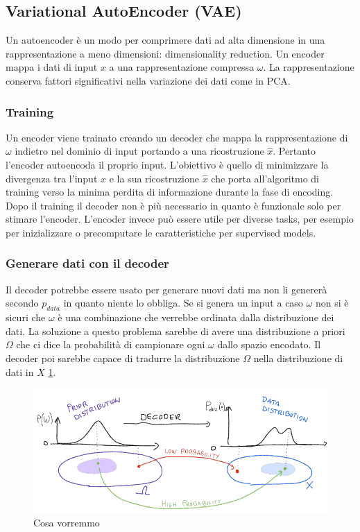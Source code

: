 \subsection{Variational AutoEncoder (VAE)}
Un autoencoder \`e un modo per comprimere dati ad alta dimensione in una rappresentazione a meno dimensioni: dimensionality reduction.
Un encoder mappa i dati di input $x$ a una rappresentazione compressa $\omega$.
La rappresentazione conserva fattori significativi nella variazione dei dati come in PCA.

\subsubsection{Training}
Un encoder viene trainato creando un decoder che mappa la rappresentazione di $\omega$ indietro nel dominio di input portando a una ricostruzione $\hat{x}$.
Pertanto l'encoder autoencoda il proprio input.
L'obiettivo \`e quello di minimizzare la divergenza tra l'input $x$ e la sua ricostruzione $\hat{x}$ che porta all'algoritmo di training verso la minima perdita di informazione durante la fase di encoding.
Dopo il training il decoder non \`e pi\`u necessario in quanto \`e funzionale solo per stimare l'encoder.
L'encoder invece pu\`o essere utile per diverse tasks, per esempio per inizializzare o precomputare le caratteristiche per supervised models.

\subsubsection{Generare dati con il decoder}
Il decoder potrebbe essere usato per generare nuovi dati ma non li generer\`a secondo $p_{data}$ in quanto niente lo obbliga.
Se si genera un input a caso $\omega$ non si \`e sicuri che $\omega$ \`e una combinazione che verrebbe ordinata dalla distribuzione dei dati.
La soluzione a questo problema sarebbe di avere una distribuzione a priori $\Omega$ che ci dice la probabilit\`a di campionare ogni $\omega$ dallo spazio encodato.
Il decoder poi sarebbe capace di tradurre la distribuzione $\Omega$ nella distribuzione di dati in $X$ \ref{fig:chapter12-13}.
\begin{figure}
	\centering
	\includegraphics[width=0.6\linewidth]{imgs/chapter12/img13}
	\caption{Cosa vorremmo}
	\label{fig:chapter12-13}
\end{figure}

